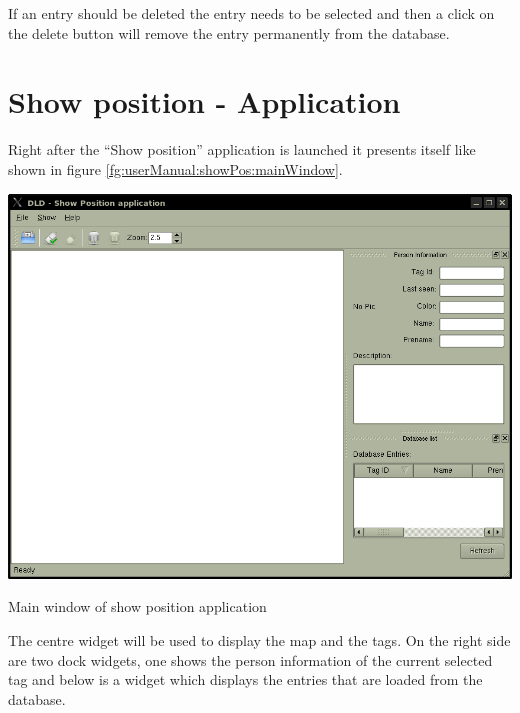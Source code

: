   If an entry should be deleted the entry needs to be selected and then a click on the delete button will remove the entry permanently from the database.

 \section{Show position - Application}
  Right after the ``Show position'' application is launched it presents itself like shown in figure \ref{fg:userManual:showPos:mainWindow}.
  \begin{staticFigure}
   \begin{center}
     \includegraphics[scale=0.6]{images/UserManual/showPos/main.png}
     \caption{Main window of show position application}
     \label{fg:userManual:showPos:mainWindow}
   \end{center}
  \end{staticFigure}
  The centre widget will be used to display the map and the tags. On the right side are two dock widgets, one shows the person information of the current selected tag and below is a widget which displays the entries that are loaded from the database.
  

